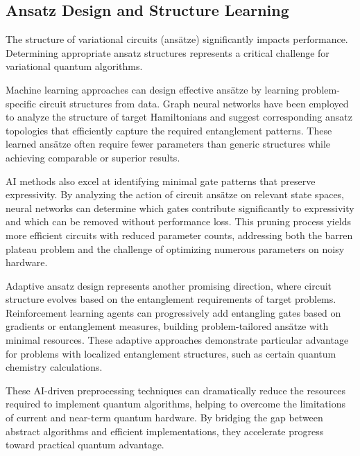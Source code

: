 \subsection{Ansatz Design and Structure Learning}

The structure of variational circuits (ansätze) significantly impacts performance. Determining appropriate ansatz structures represents a critical challenge for variational quantum algorithms.

Machine learning approaches can design effective ansätze by learning problem-specific circuit structures from data. Graph neural networks have been employed to analyze the structure of target Hamiltonians and suggest corresponding ansatz topologies that efficiently capture the required entanglement patterns. These learned ansätze often require fewer parameters than generic structures while achieving comparable or superior results.

AI methods also excel at identifying minimal gate patterns that preserve expressivity. By analyzing the action of circuit ansätze on relevant state spaces, neural networks can determine which gates contribute significantly to expressivity and which can be removed without performance loss. This pruning process yields more efficient circuits with reduced parameter counts, addressing both the barren plateau problem and the challenge of optimizing numerous parameters on noisy hardware.

Adaptive ansatz design represents another promising direction, where circuit structure evolves based on the entanglement requirements of target problems. Reinforcement learning agents can progressively add entangling gates based on gradients or entanglement measures, building problem-tailored ansätze with minimal resources. These adaptive approaches demonstrate particular advantage for problems with localized entanglement structures, such as certain quantum chemistry calculations.

These AI-driven preprocessing techniques can dramatically reduce the resources required to implement quantum algorithms, helping to overcome the limitations of current and near-term quantum hardware. By bridging the gap between abstract algorithms and efficient implementations, they accelerate progress toward practical quantum advantage.

